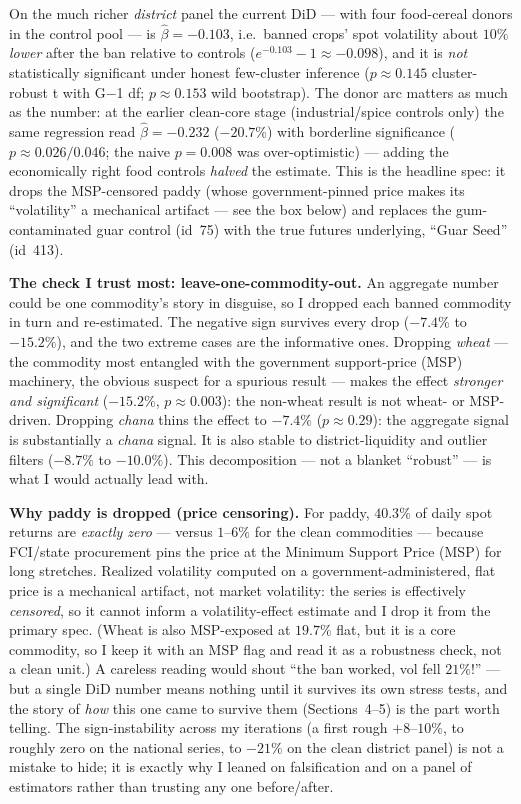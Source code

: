 \documentclass[11pt]{article}
\begin{document}
On the much richer \emph{district} panel the current DiD --- with four food-cereal donors in the
control pool --- is $\hat\beta = -0.103$, i.e.\ banned crops' spot volatility about $10\%$
\emph{lower} after the ban relative to controls ($e^{-0.103}-1 \approx -0.098$), and it is
\emph{not} statistically significant under honest few-cluster inference ($p\approx0.145$
cluster-robust t with G$-$1 df; $p\approx0.153$ wild bootstrap). The donor arc matters as much as
the number: at the earlier clean-core stage (industrial/spice controls only) the same regression
read $\hat\beta=-0.232$ ($-20.7\%$) with borderline significance ($p\approx0.026/0.046$; the naive
$p=0.008$ was over-optimistic) --- adding the economically right food controls \emph{halved} the
estimate. This is the headline spec: it drops the MSP-censored paddy (whose government-pinned
price makes its ``volatility'' a mechanical artifact --- see the box below) and replaces the
gum-contaminated guar control (id~75) with the true futures underlying, ``Guar Seed'' (id~413).

\smallskip\noindent\textbf{The check I trust most: leave-one-commodity-out.} An aggregate number
could be one commodity's story in disguise, so I dropped each banned commodity in turn and
re-estimated. The negative sign survives every drop ($-7.4\%$ to $-15.2\%$), and the two extreme
cases are the informative ones. Dropping \emph{wheat} --- the commodity most entangled with the
government support-price (MSP) machinery, the obvious suspect for a spurious result --- makes the
effect \emph{stronger and significant} ($-15.2\%$, $p\approx0.003$): the non-wheat result is not
wheat- or MSP-driven. Dropping \emph{chana} thins the effect to $-7.4\%$ ($p\approx0.29$): the
aggregate signal is substantially a \emph{chana} signal. It is also stable to district-liquidity
and outlier filters ($-8.7\%$ to $-10.0\%$). This decomposition --- not a blanket ``robust'' ---
is what I would actually lead with.

\smallskip\noindent\textbf{Why paddy is dropped (price censoring).} For paddy, $40.3\%$ of daily
spot returns are \emph{exactly zero} --- versus $1$--$6\%$ for the clean commodities --- because
FCI/state procurement pins the price at the Minimum Support Price (MSP) for long stretches. Realized
volatility computed on a government-administered, flat price is a mechanical artifact, not market
volatility: the series is effectively \emph{censored}, so it cannot inform a volatility-effect
estimate and I drop it from the primary spec. (Wheat is also MSP-exposed at $19.7\%$ flat, but it is
a core commodity, so I keep it with an MSP flag and read it as a robustness check, not a clean unit.) A careless reading would shout ``the ban worked, vol fell $21\%$!'' --- but a single DiD
number means nothing until it survives its own stress tests, and the story of \emph{how} this one
came to survive them (Sections~4--5) is the part worth telling. The sign-instability across my
iterations (a first rough $+8$--$10\%$, to roughly zero on the national series, to $-21\%$ on the
clean district panel) is not a mistake to hide; it is exactly why I leaned on falsification and on a
panel of estimators rather than trusting any one before/after.
\end{document}
